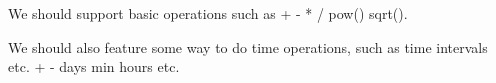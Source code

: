 We should support basic operations such as + - * / pow() sqrt().

We should also feature some way to do time operations, such as time intervals etc. + - days min hours etc.
